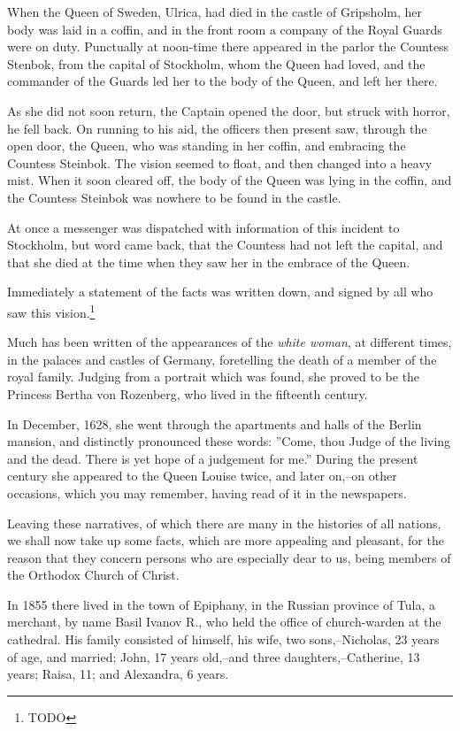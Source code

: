 When the Queen of Sweden, Ulrica, had died in the castle of Gripsholm, her body was laid in a coffin, and in the front room a company of the Royal Guards were on duty. Punctually at noon-time there appeared in the parlor the Countess Stenbok, from the capital of Stockholm, whom the Queen had loved, and the commander of the Guards led her to the body of the Queen, and left her there.

As she did not soon return, the Captain opened the door, but struck with horror, he fell back. On running to his aid, the officers then present saw, through the open door, the Queen, who was standing in her coffin, and embracing the Countess Steinbok. The vision seemed to float, and then changed into a heavy mist. When it soon cleared off, the body of the Queen was lying in the coffin, and the Countess Steinbok was nowhere to be found in the castle.

At once a messenger was dispatched with information of this incident to Stockholm, but word came back, that the Countess had not left the capital, and that she died at the time when they saw her in the embrace of the Queen.

Immediately a statement of the facts was written down, and signed by all who saw this vision.\footnote{TODO}

Much has been written of the appearances of the \textit{white woman}, at different times, in the palaces and castles of Germany, foretelling the death of a member of the royal family. Judging from a portrait which was found, she proved to be the Princess Bertha von Rozenberg, who lived in the fifteenth century.

In December, 1628, she went through the apartments and halls of the Berlin mansion, and distinctly pronounced these words: ''Come, thou Judge of the living and the dead. There is yet hope of a judgement for me.'' During the present century she appeared to the Queen Louise twice, and later on,--on other occasions, which you may remember, having read of it in the newspapers.

Leaving these narratives, of which there are many in the histories of all nations, we shall now take up some facts, which are more appealing and pleasant, for the reason that they concern persons who are especially dear to us, being members of the Orthodox Church of Christ.

In 1855 there lived in the town of Epiphany, in the Russian province of Tula, a merchant, by name Basil Ivanov R., who held the office of church-warden at the cathedral. His family consisted of himself, his wife, two sons,--Nicholas, 23 years of age, and married; John, 17 years old,--and three daughters,--Catherine, 13 years; Raisa, 11; and Alexandra, 6 years.

